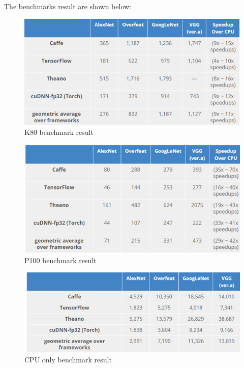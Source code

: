 \documentclass[conference]{IEEEtran}
\begin{document}
The benchmarks result are shown below:
\begin{figure}[H]
\centering
  \begin{minipage}{.4\textwidth}
    \centering
    \includegraphics[width=1.0\linewidth]{k80_benchmark.jpg}
    \caption{K80 benchmark result}
    \label{fig:fig_1}
  \end{minipage}
\end{figure}

\begin{figure}[H]
\centering
  \begin{minipage}{.4\textwidth}
    \centering
    \includegraphics[width=1.0\linewidth]{P100_benchmark.jpg}
    \caption{P100 benchmark result}
    \label{fig:fig_1}
  \end{minipage}
\end{figure}

\begin{figure}[H]
\centering
  \begin{minipage}{.4\textwidth}
    \centering
    \includegraphics[width=1.0\linewidth]{cpu_only.jpg}
    \caption{CPU only benchmark result}
    \label{fig:fig_1}
  \end{minipage}
\end{figure}
\end{document}
